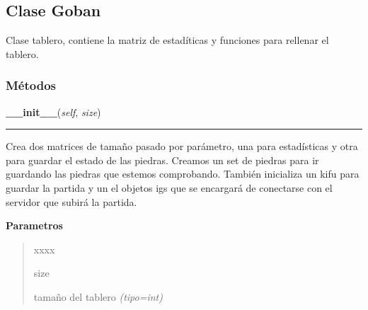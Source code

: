 
\subsection{Clase Goban}

    \label{src:goban:Goban}

Clase tablero, contiene la matriz de estadíticas y funciones para rellenar el tablero.


  \subsubsection{Métodos}

    \label{src:goban:Goban:__init__}

    \vspace{0.5ex}

\hspace{.8\funcindent}\begin{boxedminipage}{\funcwidth}

    \raggedright \textbf{\_\_init\_\_}(\textit{self}, \textit{size})

    \vspace{-1.5ex}

    \rule{\textwidth}{0.5\fboxrule}
\setlength{\parskip}{2ex}
Crea dos matrices de tamaño pasado por parámetro, una para estadísticas y otra para guardar el estado de las piedras. Creamos un set de piedras para ir guardando las piedras que estemos comprobando.  También inicializa un kifu para guardar la partida y un el objetos igs que se encargará de conectarse con el servidor que subirá la partida.

\setlength{\parskip}{1ex}
      \textbf{Parametros}
      \vspace{-1ex}

      \begin{quote}
        \begin{Ventry}{xxxx}

          \item[size]


tamaño del tablero
            {\it (tipo=int)}

        \end{Ventry}

      \end{quote}

    \end{boxedminipage}

